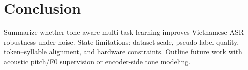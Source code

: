 \section{Conclusion}
Summarize whether tone-aware multi-task learning improves Vietnamese ASR robustness under noise. State limitations: dataset scale, pseudo-label quality, token--syllable alignment, and hardware constraints. Outline future work with acoustic pitch/F0 supervision or encoder-side tone modeling.
